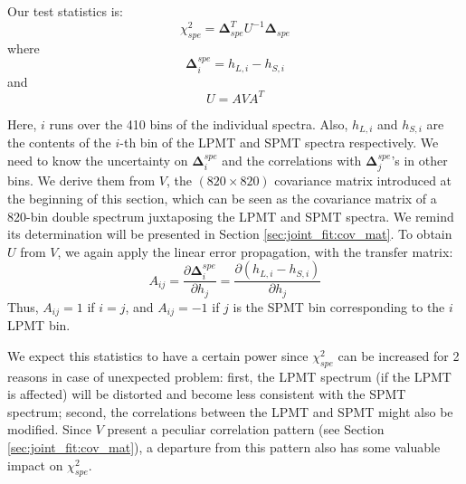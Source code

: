 \documentclass[../main.tex]{subfiles}
\begin{document}
Our test statistics is:
\begin{equation}
  \chi^2_{spe} = \bm{\Delta}_{spe}^T U^{-1} \bm{\Delta}_{spe}
\end{equation}
where
\begin{equation}
  \bm{\Delta}^{spe}_i = h_{L,i} - h_{S,i}
\end{equation}
and
\begin{equation}
  U = A V A^T
\end{equation}

Here, $i$ runs over the 410 bins of the individual spectra. Also, $h_{L,i}$ and $h_{S,i}$ are the contents of the $i$-th bin of the LPMT and SPMT spectra respectively. We need to know the uncertainty on $\bm{\Delta}^{spe}_i$ and the correlations with $\bm{\Delta}^{spe}_j$'s in other bins. We derive them from $V$, the $(820 \times 820)$ covariance matrix introduced at the beginning of this section, which can be seen as the covariance matrix of a 820-bin double spectrum juxtaposing the LPMT and SPMT spectra. We remind its determination will be presented in Section \ref{sec:joint_fit:cov_mat}. To obtain $U$ from $V$, we again apply the linear error propagation, with the transfer matrix:
\begin{equation}
  A_{ij} = \frac{\partial \bm{\Delta}^{spe}_i}{\partial h_j} = \frac{\partial(h_{L, i} - h_{S, i})}{\partial h_j}
\end{equation}
Thus, $A_{ij} = 1$ if $i = j$, and $A_{ij} = -1$ if $j$ is the SPMT bin corresponding to the $i$ LPMT bin.

We expect this statistics to have a certain power since $\chi^2_{spe}$ can be increased for 2 reasons in case of unexpected problem: first, the LPMT spectrum (if the LPMT is affected) will be distorted and become less consistent with the SPMT spectrum; second, the correlations between the LPMT and SPMT might also be modified. Since $V$ present a peculiar correlation pattern (see Section \ref{sec:joint_fit:cov_mat}), a departure from this pattern also has some valuable impact on $\chi^2_{spe}$.


\end{document}
